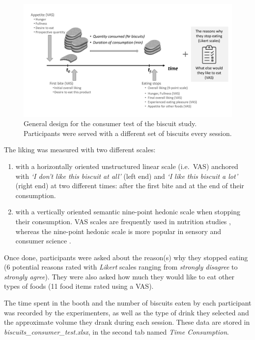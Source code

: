 \documentclass[
]{krantz}
\providecommand{\tightlist}{%
  \setlength{\itemsep}{0pt}\setlength{\parskip}{0pt}}
\begin{document}
\begin{figure}

{\centering \includegraphics[width=42.47in]{images/consumer_test_design} 

}

\caption{General design for the consumer test of the biscuit study. Participants were served with a different set of biscuits every session.}\label{fig:test-design}
\end{figure}

The liking was measured with two different scales:

\begin{enumerate}
\def\labelenumi{\arabic{enumi}.}
\tightlist
\item
  with a horizontally oriented unstructured linear scale (i.e.~VAS) anchored with \emph{`I don't like this biscuit at all'} (left end) and \emph{`I like this biscuit a lot'} (right end) at two different times: after the first bite and at the end of their consumption.
\item
  with a vertically oriented semantic nine-point hedonic scale when stopping their consumption.
  VAS scales are frequently used in nutrition studies \citep{stubbs2000}, whereas the nine-point hedonic scale is more popular in sensory and consumer science \citep{peryam1957, wichchukit2015}.
\end{enumerate}

Once done, participants were asked about the reason(s) why they stopped eating (6 potential reasons rated with \emph{Likert} scales ranging from \emph{strongly disagree} to \emph{strongly agree}). They were also asked how much they would like to eat other types of foods (11 food items rated using a VAS).

The time spent in the booth and the number of biscuits eaten by each participant was recorded by the experimenters, as well as the type of drink they selected and the approximate volume they drank during each session. These data are stored in \emph{biscuits\_consumer\_test.xlsx}, in the second tab named \emph{Time Consumption}.
\end{document}
